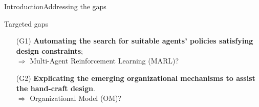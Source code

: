 \begin{frame}{Introduction}{Addressing the gaps}

    \begin{alertblock}{Targeted gaps}
        \begin{enumerate}
            \item[\phantom{X} (G1)] \textbf{Automating the search for suitable agents' policies satisfying design constraints};
                \\ $\Longrightarrow$ Multi-Agent Reinforcement Learning (MARL)?
            \item[\phantom{X} (G2)] \textbf{Explicating the emerging organizational mechanisms to assist the hand-craft design}.
                \\ $\Longrightarrow$ Organizational Model (OM)?
        \end{enumerate}
    \end{alertblock}


    \begin{table}[]


\end{table}
\end{frame}
